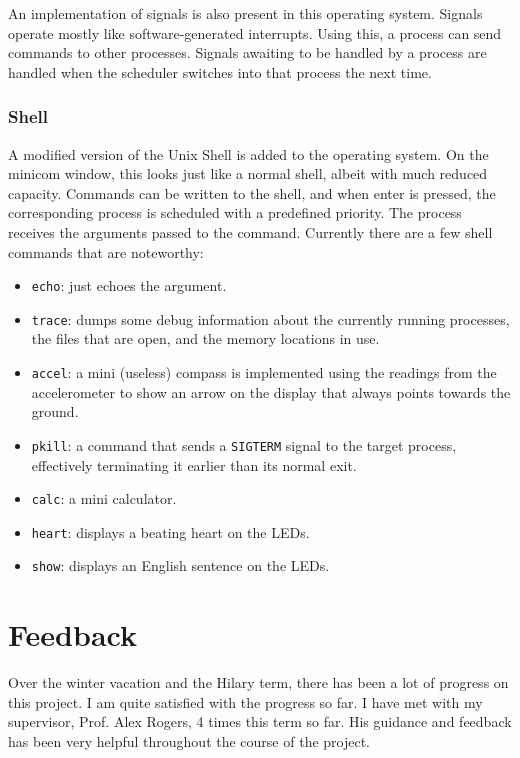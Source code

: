 \documentclass[oxford]{ahsan}
\begin{document}
An implementation of signals is also present in this operating system. Signals operate
mostly like software-generated interrupts. Using this, a process can send commands to
other processes. Signals awaiting to be handled by a process are handled when the
scheduler switches into that process the next time.

\subsubsection*{Shell}

A modified version of the Unix Shell is added to the operating system. On the minicom
window, this looks just like a normal shell, albeit with much reduced capacity.
Commands can be written to the shell, and when enter is pressed, the corresponding
process is scheduled with a predefined priority. The process receives the arguments
passed to the command. Currently there are a few shell commands that are noteworthy:

\begin{itemize}
    \item \texttt{echo}: just echoes the argument.
    \item \texttt{trace}: dumps some debug information about the currently running
        processes, the files that are open, and the memory locations in use.
    \item \texttt{accel}: a mini (useless) compass is implemented using the readings
        from the accelerometer to show an arrow on the display that always points
        towards the ground.
    \item \texttt{pkill}: a command that sends a \texttt{SIGTERM} signal to the target
        process, effectively terminating it earlier than its normal exit.
    \item \texttt{calc}: a mini calculator.
    \item \texttt{heart}: displays a beating heart on the LEDs.
    \item \texttt{show}: displays an English sentence on the LEDs. 
\end{itemize}

\section*{Feedback}

Over the winter vacation and the Hilary term, there has been a lot of progress on this
project. I am quite satisfied with the progress so far. I have met with my supervisor,
Prof. Alex Rogers, 4 times this term so far. His guidance and feedback has been very
helpful throughout the course of the project.

\printbibliography
\end{document}
